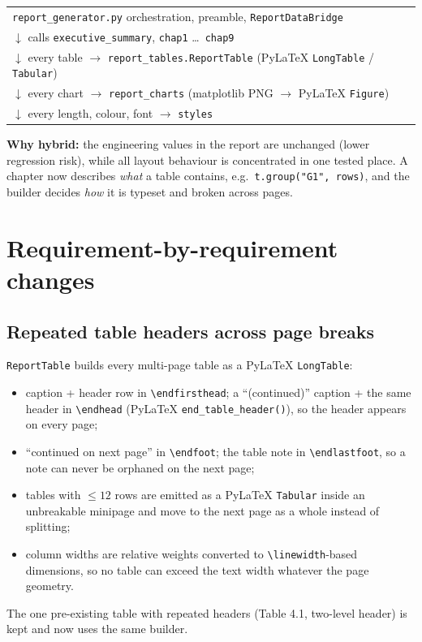 \documentclass[11pt,a4paper]{article}
\newcommand{\code}[1]{\texttt{\small #1}}
\begin{document}
\begin{center}\small
\begin{tabular}{l}
\code{report\_generator.py} \quad orchestration, preamble, \code{ReportDataBridge}\\
\quad $\downarrow$ calls \code{executive\_summary}, \code{chap1} \dots\ \code{chap9}\\
\quad\quad $\downarrow$ every table \quad $\rightarrow$ \code{report\_tables.ReportTable} \quad (PyLaTeX \code{LongTable} / \code{Tabular})\\
\quad\quad $\downarrow$ every chart \quad $\rightarrow$ \code{report\_charts} \quad (matplotlib PNG $\rightarrow$ PyLaTeX \code{Figure})\\
\quad\quad $\downarrow$ every length, colour, font \quad $\rightarrow$ \code{styles}\\
\end{tabular}
\end{center}

\textbf{Why hybrid:} the engineering values in the report are unchanged (lower regression risk), while all
layout behaviour is concentrated in one tested place. A chapter now describes \emph{what} a table contains,
e.g.\ \code{t.group("G1", rows)}, and the builder decides \emph{how} it is typeset and broken across pages.

\section{Requirement-by-requirement changes}

\subsection{Repeated table headers across page breaks}
\code{ReportTable} builds every multi-page table as a PyLaTeX \code{LongTable}:
\begin{itemize}
\item caption + header row in \code{\textbackslash endfirsthead}; a ``(continued)'' caption + the same header in
\code{\textbackslash endhead} (PyLaTeX \code{end\_table\_header()}), so the header appears on every page;
\item ``continued on next page'' in \code{\textbackslash endfoot}; the table note in \code{\textbackslash endlastfoot},
so a note can never be orphaned on the next page;
\item tables with $\leq 12$ rows are emitted as a PyLaTeX \code{Tabular} inside an unbreakable minipage and
move to the next page as a whole instead of splitting;
\item column widths are relative weights converted to \code{\textbackslash linewidth}-based dimensions, so no
table can exceed the text width whatever the page geometry.
\end{itemize}
The one pre-existing table with repeated headers (Table 4.1, two-level header) is kept and now uses the same builder.
\end{document}
